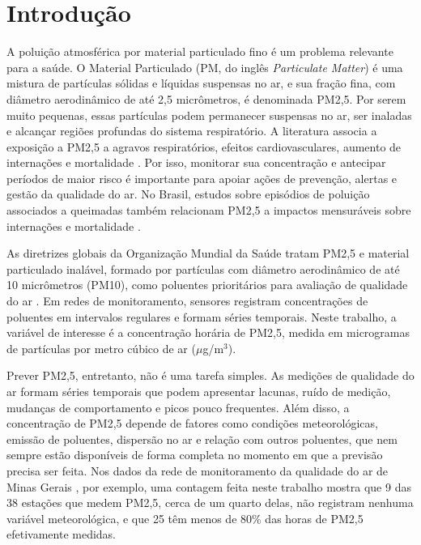 \chapter{Introdução}
\label{chap:introducao}

A poluição atmosférica por material particulado fino é um problema relevante para a saúde. O Material Particulado (PM, do inglês \textit{Particulate Matter}) é uma mistura de partículas sólidas e líquidas suspensas no ar, e sua fração fina, com diâmetro aerodinâmico de até 2,5 micrômetros, é denominada PM2,5. Por serem muito pequenas, essas partículas podem permanecer suspensas no ar, ser inaladas e alcançar regiões profundas do sistema respiratório. A literatura associa a exposição a PM2,5 a agravos respiratórios, efeitos cardiovasculares, aumento de internações e mortalidade \cite{who2021air,pope2006health,brook2010particulate}. Por isso, monitorar sua concentração e antecipar períodos de maior risco é importante para apoiar ações de prevenção, alertas e gestão da qualidade do ar. No Brasil, estudos sobre episódios de poluição associados a queimadas também relacionam PM2,5 a impactos mensuráveis sobre internações e mortalidade \cite{requia2021health,requia2022short}.

As diretrizes globais da Organização Mundial da Saúde tratam PM2,5 e material particulado inalável, formado por partículas com diâmetro aerodinâmico de até 10 micrômetros (PM10), como poluentes prioritários para avaliação de qualidade do ar \cite{who2021air}. Em redes de monitoramento, sensores registram concentrações de poluentes em intervalos regulares e formam séries temporais. Neste trabalho, a variável de interesse é a concentração horária de PM2,5, medida em microgramas de partículas por metro cúbico de ar (\(\mu\)g/m\(^3\)).

Prever PM2,5, entretanto, não é uma tarefa simples. As medições de qualidade do ar formam séries temporais que podem apresentar lacunas, ruído de medição, mudanças de comportamento e picos pouco frequentes. Além disso, a concentração de PM2,5 depende de fatores como condições meteorológicas, emissão de poluentes, dispersão no ar e relação com outros poluentes, que nem sempre estão disponíveis de forma completa no momento em que a previsão precisa ser feita. Nos dados da rede de monitoramento da qualidade do ar de Minas Gerais \cite{feam2026dadosmonitoramento}, por exemplo, uma contagem feita neste trabalho mostra que 9 das 38 estações que medem PM2,5, cerca de um quarto delas, não registram nenhuma variável meteorológica, e que 25 têm menos de 80\% das horas de PM2,5 efetivamente medidas.

